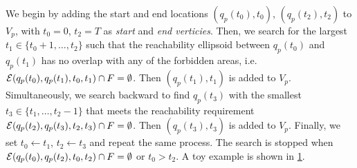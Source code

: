 \documentclass[10pt,twocolumn,twoside]{IEEEtran}
\newcommand{\news}{\color{blue}}
\begin{document}
{\news We begin by adding the start and end locations $(q_{p}(t_0),t_0)$, $(q_{p}(t_2),t_2)$ to $V_{p}$, with $t_{0}=0$, $t_2=T$ as \emph{start} and \emph{end verticies}. Then, we search for the largest $t_{1} \in \{t_{0}+1, \dots ,t_{2}\}$ such that the reachability ellipsoid between $q_{p}(t_{0})$ and $q_{p}(t_{1})$ has no overlap with any of the forbidden areas, i.e. $\mathcal{E}(q_{p}(t_{0}),q_{p}(t_{1}), t_{0},t_{1})\cap F = \emptyset$. Then $(q_{p}(t_{1}),t_1)$ is added to $V_{p}$. Simultaneously, we search backward to find $q_{p}(t_{3})$ with the smallest $t_{3}\in \{t_{1},\dots,t_{2}-1\} $ that meets the reachability requirement $\mathcal{E}(q_{p}(t_{2}),q_{p}(t_{3}),t_{2},t_{3}) \cap F = \emptyset$. Then $(q_{p}(t_{3}),t_3)$ is added to $V_{p}$. Finally, we set $t_{0}\leftarrow t_{1}$, $t_{2}\leftarrow t_{3}$ and repeat the same process. The search is stopped when $\mathcal{E}(q_{p}(t_{0}),q_{p}(t_{2}),t_{0},t_{2}) \cap F = \emptyset$ or $t_{0}>t_{2}$. A toy example is shown in \cref{fig:checkpoint-generate}. }

\begin{figure}
	\centering
    \caption{\news{Checkpoint generation example}}\label{fig:checkpoint-generate}
\end{figure}
\end{document}
